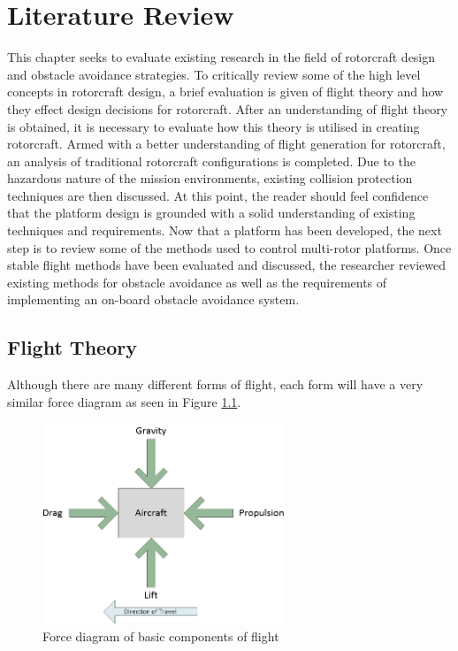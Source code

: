 \chapter{Literature Review}
This chapter seeks to evaluate existing research in the field of rotorcraft design and obstacle avoidance strategies. To critically review some of the high level concepts in rotorcraft design, a brief evaluation is given of flight theory and how they effect design decisions for rotorcraft. After an understanding of flight theory is obtained, it is necessary to evaluate how this theory is utilised in creating rotorcraft. Armed with a better understanding of flight generation for rotorcraft, an analysis of traditional rotorcraft configurations is completed. Due to the hazardous nature of the mission environments, existing collision protection techniques are then discussed. At this point, the reader should feel confidence that the platform design is grounded with a solid understanding of existing techniques and requirements.
Now that a platform has been developed, the next step is to review some of the methods used to control multi-rotor platforms. Once stable flight methods have been evaluated and discussed, the researcher reviewed existing methods for obstacle avoidance as well as the requirements of implementing an on-board obstacle avoidance system.

\section{Flight Theory}

Although there are many different forms of flight, each form will have a very similar force diagram as seen in Figure \ref{IM_FlightForces}. 

\begin{figure}
\centering
\includegraphics[height = 6cm]{Images/Literature/Flight}
\caption{Force diagram of basic components of flight}
\label{IM_FlightForces}
\end{figure}

